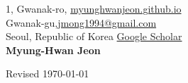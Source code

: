 \documentclass{cv} %
\begin{document}
1, Gwanak-ro,  \hfill \href{https://myunghwanjeon.github.io/}{myunghwanjeon.github.io}\\
Gwanak-gu,\hfill \href{mailto:jmong1994@gmail.com}{jmong1994@gmail.com}\\
Seoul, Republic of Korea \hfill \href{https://scholar.google.com/citations?user=ivOqySYAAAAJ}{Google Scholar} \\

\hfil{\namesize\bf Myung-Hwan Jeon}\hfil

\vspace{-3mm}





\clearpage








\vspace{0.5in}
\hfill Revised \today
\end{document}
